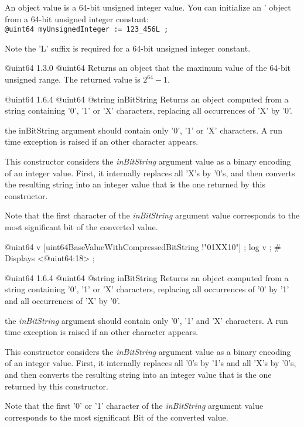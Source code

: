 
An  object value is a 64-bit unsigned integer value. You can initialize an ' object from a 64-bit unsigned integer constant:\\

\texttt{@uint64 myUnsignedInteger := 123\_456L ;}\newline

Note the 'L' suffix is required for a 64-bit unsigned integer constant.



{@uint64}
{1.3.0}
{@uint64}
{Returns an  object that the maximum value of the 64-bit unsigned range.}
{The returned value is $2^{64}-1$.}


{@uint64}
{1.6.4}
{@uint64}
{@string inBitString}
{Returns an  object computed from a string containing '0', '1' or 'X' characters, replacing all occurrences of 'X' by '0'.}
{the inBitString argument should contain only '0', '1' or 'X' characters. A run time exception is raised if an other character appears.

This constructor considers the \emph{inBitString} argument value as a binary encoding of an integer value. First, it internally replaces all 'X's by '0's, and then converts the resulting string into an integer value that is the one returned by this constructor.

Note that the first character of the \emph{inBitString} argument value corresponds to the most significant bit of the converted value.}


\exempleDeuxLignes
{@uint64 v [uint64BaseValueWithCompressedBitString !"01XX10"] ;}
{log v ; \# Displays <@uint64:18> ;}





{@uint64}
{1.6.4}
{@uint64}
{@string inBitString}
{Returns an  object computed from a string containing '0', '1' or 'X' characters, replacing all occurrences of '0' by '1' and all occurrences of 'X' by '0'.}
{the \emph{inBitString} argument should contain only '0', '1' and 'X' characters. A run time exception is raised if an other character appears.

This constructor considers the \emph{inBitString} argument value as a binary encoding of an integer value. First, it internally replaces all '0's by '1's and all 'X's by '0's, and then converts the resulting string into an integer value that is the one returned by this constructor.

Note that the first '0' or '1' character of the \emph{inBitString} argument value corresponds to the most significant Bit of the converted value.}

